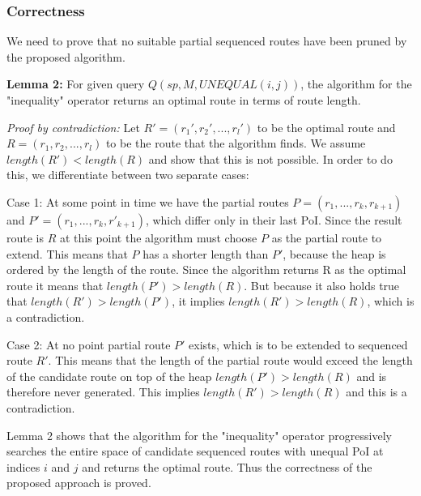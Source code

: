 \subsubsection{Correctness}
\label{sec:correctnessNEO}
We need to prove that no suitable partial sequenced routes have been pruned by the proposed algorithm.

\textbf{Lemma 2:} For given query $Q(sp, M, UNEQUAL(i, j))$, the algorithm for the "inequality" operator returns an optimal route in terms of route length.

\textit{Proof by contradiction:} Let $R' = (r_1', r_2', ..., r_l')$ to be the optimal route and $R = (r_1, r_2, ..., r_l)$ to be the route that the algorithm finds. We assume $length(R') < length(R)$ and show that this is not possible. In order to do this, we differentiate between two separate cases: 

Case 1: At some point in time we have the partial routes $P = (r_1, ..., r_k, r_{k+1})$ and $P' = (r_1, ..., r_k, r'_{k+1})$, which differ only in their last PoI. Since the result route is $R$ at this point the algorithm must choose $P$ as the partial route to extend. This means that $P$ has a shorter length than $P'$, because the heap is ordered by the length of the route. Since the algorithm returns R as the optimal route it means that $length(P') > length(R)$. But because it also holds true that $length(R') > length(P')$, it implies $length(R') > length(R)$, which is a contradiction.

Case 2: At no point partial route $P'$ exists, which is to be extended to sequenced route $R'$. This means that the length of the partial route would exceed the length of the candidate route on top of the heap $length(P') > length(R)$ and is therefore never generated. This implies $length(R') > length(R)$ and this is a contradiction.

Lemma 2 shows that the algorithm for the "inequality" operator progressively searches the entire space of candidate sequenced routes with unequal PoI at indices $i$ and $j$ and returns the optimal route. Thus the correctness of the proposed approach is proved.